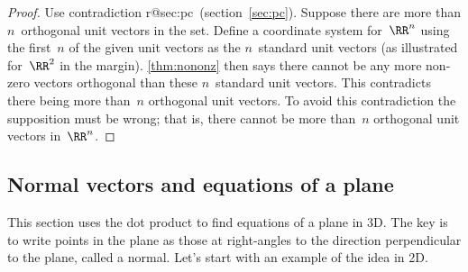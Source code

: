 \begin{proof} 
Use contradiction%
\ifcsname r@sec:pc\endcsname\ (section~\ref{sec:pc})\fi.
Suppose there are more than \(n\)~orthogonal unit vectors in the set.
%
Define a coordinate system for~\(\RR^n\) using the first~\(n\) of the given unit vectors as the \(n\)~standard unit vectors 
(as illustrated for~\(\RR^2\) in the margin).
\autoref{thm:nononz} then says there cannot be any more non-zero vectors orthogonal than these \(n\)~standard unit vectors.
This contradicts there being more than~\(n\) orthogonal unit vectors.
To avoid this contradiction the supposition must be wrong; that is, there cannot be more than~\(n\) orthogonal unit vectors in~\(\RR^n\).
\end{proof}








\subsection{Normal vectors and equations of a plane}
\label{sec:nvep}


This section uses the dot product to find equations of a plane in 3D.
The key is to write points in the plane as those at right-angles to the direction perpendicular to the plane, called a normal.
Let's start with an example of the idea in 2D.

